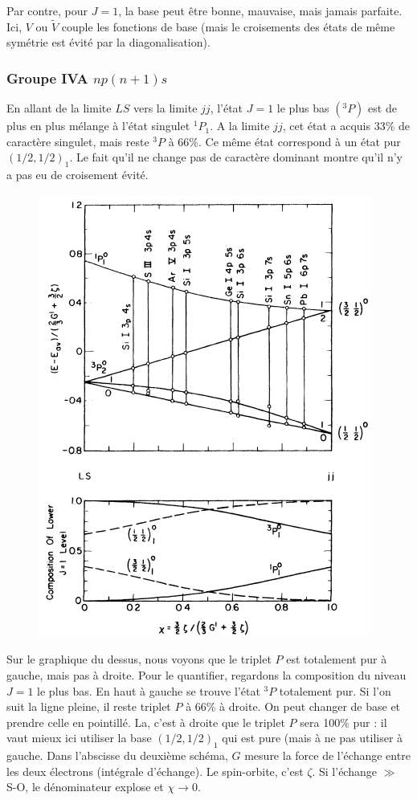 Par contre, pour $J=1$, la base peut être bonne, mauvaise, mais jamais parfaite. Ici, 
$V$ ou $\tilde{V}$ couple les fonctions de base (mais le croisements des états de même
symétrie est évité par la diagonalisation).

\subsubsection{Groupe IVA $np(n+1)s$}
En allant de la limite $LS$ vers la limite $jj$, l'état $J=1$ le plus bas $(^3P)$ est 
de plus en plus mélange à l'état singulet $^1P_1$. A la limite $jj$, cet état a acquis 
33\% de caractère singulet, mais reste $^3P$ à 66\%. Ce même état correspond à un état 
pur $(1/2,1/2)_1$. Le fait qu'il ne change pas de caractère dominant montre qu'il n'y
a pas eu de croisement évité.\\

	\begin{figure}
	\vspace{-5mm}
	\includegraphics[scale=0.5]{ch1/image9}
	\end{figure}
Sur le graphique du dessus, nous voyons que le triplet $P$ est totalement pur à gauche,
mais pas à droite. Pour le quantifier, regardons la composition du niveau $J=1$ le plus
bas. En haut à gauche se trouve l'état $^3P$ totalement pur. Si l'on suit la ligne pleine,
il reste triplet $P$ à 66\% à droite. On peut changer de base et prendre celle en 
pointillé. La, c'est à droite que le triplet $P$ sera 100\% pur : il vaut mieux ici utiliser
la base $\left(1/2,1/2\right)_1$ qui est pure (mais à ne pas utiliser à gauche. Dans l'abscisse du 
deuxième schéma, $G$ mesure la force de l'échange entre les deux électrons (intégrale
d'échange). Le spin-orbite, c'est $\zeta$. Si l'échange $\gg$ S-O, le dénominateur explose
et $\chi\to0$.\\

